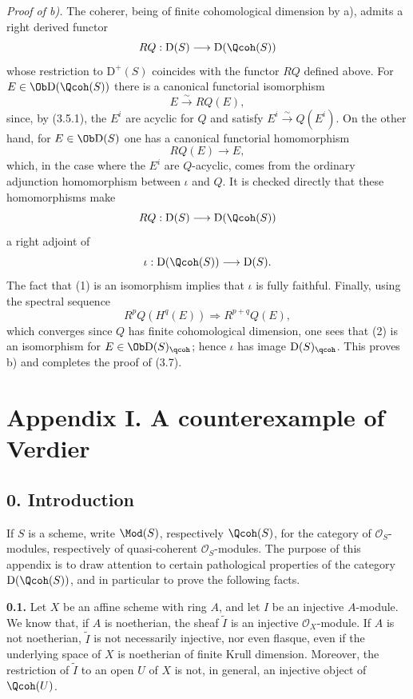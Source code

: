 \emph{Proof of b).} The coherer, being of finite cohomological dimension by a), admits a right derived functor
\[
 RQ:\mathrm D(S)\longrightarrow\mathrm D(\Qcoh(S))
\]
whose restriction to $\mathrm D^+(S)$ coincides with the functor $RQ$ defined above. For $E\in\Ob\mathrm D(\Qcoh(S))$ there is a canonical functorial isomorphism
\begin{equation}\tag{1}
 E\xrightarrow{\sim}RQ(E),
\end{equation}
since, by (3.5.1), the $E^i$ are acyclic for $Q$ and satisfy $E^i\xrightarrow{\sim}Q(E^i)$. On the other hand, for $E\in\Ob\mathrm D(S)$ one has a canonical functorial homomorphism
\begin{equation}\tag{2}
 RQ(E)\longrightarrow E,
\end{equation}
which, in the case where the $E^i$ are $Q$-acyclic, comes from the ordinary adjunction homomorphism between $\iota$ and $Q$. It is checked directly that these homomorphisms make
\[
 RQ:\mathrm D(S)\longrightarrow\mathrm D(\Qcoh(S))
\]
a right adjoint of
\[
 \iota:\mathrm D(\Qcoh(S))\longrightarrow\mathrm D(S).
\]
The fact that (1) is an isomorphism implies that $\iota$ is fully faithful. Finally, using the spectral sequence
\[
 R^pQ(H^q(E))\Longrightarrow R^{p+q}Q(E),
\]
which converges since $Q$ has finite cohomological dimension, one sees that (2) is an isomorphism for $E\in\Ob\mathrm D(S)_{\qcoh}$; hence $\iota$ has image $\mathrm D(S)_{\qcoh}$. This proves b) and completes the proof of (3.7).

\section*{Appendix I. A counterexample of Verdier}

\subsection*{0. Introduction}
If $S$ is a scheme, write $\Mod(S)$, respectively $\Qcoh(S)$, for the category of $\mathcal O_S$-modules, respectively of quasi-coherent $\mathcal O_S$-modules. The purpose of this appendix is to draw attention to certain pathological properties of the category $\mathrm D(\Qcoh(S))$, and in particular to prove the following facts.

\textbf{0.1.} Let $X$ be an affine scheme with ring $A$, and let $I$ be an injective $A$-module. We know that, if $A$ is noetherian, the sheaf $\widetilde I$ is an injective $\mathcal O_X$-module. If $A$ is not noetherian, $\widetilde I$ is not necessarily injective, nor even flasque, even if the underlying space of $X$ is noetherian of finite Krull dimension. Moreover, the restriction of $\widetilde I$ to an open $U$ of $X$ is not, in general, an injective object of $\Qcoh(U)$.

